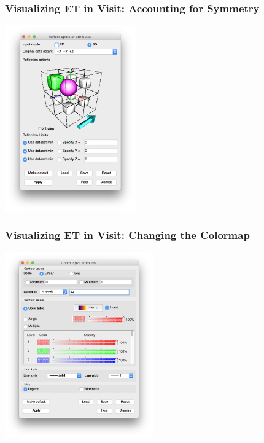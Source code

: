 \documentclass[]{beamer}
\begin{document}
\begin{frame}
  \frametitle{Visualizing ET in Visit: Accounting for Symmetry}
  \begin{center}
    \includegraphics[height=8cm]{figures/visit/symmetry-180-degree-star}
  \end{center}
\end{frame}

\begin{frame}
  \frametitle{Visualizing ET in Visit: Changing the Colormap}
    \begin{center}
    \includegraphics[height=8cm]{figures/visit/contour-colors}
  \end{center}
\end{frame}
\end{document}
